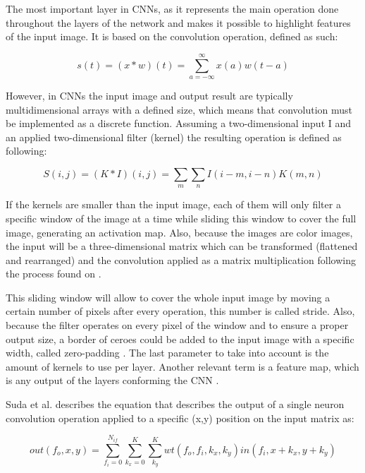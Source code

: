 The most important layer in CNNs, as it represents the main operation done throughout the layers 
of the network and makes it possible to highlight features of the input image.
It is based on the convolution operation, defined as such:

\begin{equation} \label{eq:convorig}
  s(t)
  =
  (x*w)(t)
  =
  \sum_{a=-\infty}^{\infty} x(a)w(t-a)
\end{equation}

However, in CNNs the input image and output result are typically multidimensional
arrays with a defined size, which means that convolution must be implemented
as a discrete function. Assuming a two-dimensional input I and an applied two-dimensional filter (kernel)
the resulting operation is defined as following:

\begin{equation} \label{eq:convdiscr}
  S(i,j)
  =
  (K*I)(i,j)
  =
  \sum_{m}\sum_{n} I(i-m,i-n)K(m,n)
\end{equation}

If the kernels are smaller than the input image, each of them will only filter a specific window of the image at a time
while sliding this window to cover the full image, generating an activation map. Also, because the images are color images,
the input will be a three-dimensional matrix which can be transformed (flattened and rearranged) and the convolution applied as a matrix multiplication
following the process found on \cite{suda}.

This sliding window will allow to cover the whole input image by moving a certain number of pixels after every operation, this number is called stride.
Also, because the filter operates on every pixel of the window and to ensure a proper output size, a border of ceroes could be added to the input
image with a specific width, called zero-padding \cite{karpathy2016cs231n}. The last parameter to take into account is the amount of kernels to use per layer.
Another relevant term is a feature map, which is any output of the layers conforming the CNN \cite{Goodfellow-et-al-2016}.

Suda et al. describes the equation that describes the output of a single neuron convolution operation applied to a specific (x,y) position on 
the input matrix as:

\begin{equation} \label{eq:convsuda}
  out(f_o,x,y)
  =
  \sum_{f_i=0}^{N_{if}}\sum_{k_x=0}^{K}\sum_{k_y}^{K} wt(f_o,f_i,k_x,k_y)in(f_i,x+k_x,y+k_y)
\end{equation}

